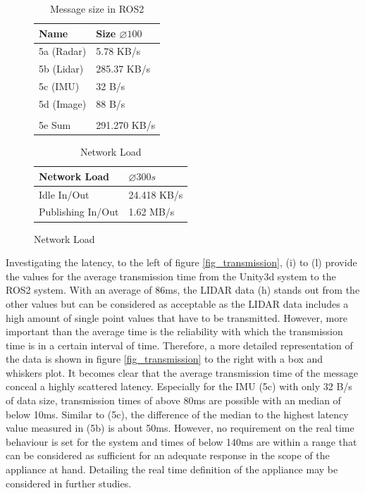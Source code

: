 	 \begin{figure}[!htb]
	 	\begin{minipage}[t]{0.48\textwidth}	
	 		\begin{table}[H]	
	 			\centering
	 			\caption{Message size in ROS2}
	 			\begin{tabular}{l l } 
	 				\toprule
	 				Name  & Size  $\varnothing100$\\ 
	 				\midrule
	 				5a (Radar) & 5.78 KB/s\\
	 				5b (Lidar) & 285.37 KB/s\\
	 				5c (\ac{IMU}) & 32 B/s \\
	 				5d (Image) & 88 B/s \\\\
	 				
	 				5e Sum         & 	291.270 KB/s\\
	 				\bottomrule
	 			\end{tabular}
	 			\label{tab_msgsize}
	 		\end{table}
	 	\end{minipage}\hfill
	 	\begin{minipage}[t]{0.48\textwidth}
	 		\begin{table}[H]
	 			\centering
	 			\caption{Network Load}
	 			\begin{tabular}{l l } 
	 				\toprule
	 				Network Load & $\varnothing300s$ \\ 
	 				\midrule
	 				Idle In/Out &24.418 KB/s \\	 
	 				Publishing In/Out & 1.62 MB/s \\
	 				\bottomrule
	 			\end{tabular}
	 			\label{tab_netload}
	 		\end{table}
	 	\end{minipage}
	 \end{figure}
	 
	 Investigating the latency, to the left of figure \ref{fig_transmission}, (i) to (l) provide the values for the average transmission time from the Unity3d system to the \ac{ROS2} system. With an average of 86ms, the \ac{LIDAR} data (h) stands out from the other values but can be considered as acceptable as the \ac{LIDAR} data includes a high amount of single point values that have to be transmitted. However, more important than the average time is the reliability with which the transmission time is in a certain interval of time. Therefore, a more detailed representation of the data is shown in figure \ref{fig_transmission} to the right with a box and whiskers plot. It becomes clear that the average transmission time of the message conceal a highly scattered latency. Especially for the \ac{IMU} (5c) with only 32 B/s of data size, transmission times of above 80ms are possible with an median of below 10ms. Similar to (5c), the difference of the median to the highest latency value measured in (5b) is about 50ms. However, no requirement on the real time behaviour is set for the system and times of below 140ms are within a range that can be considered as sufficient for an adequate response in the scope of the appliance at hand. Detailing the real time definition of the appliance may be considered in further studies. 
	 
